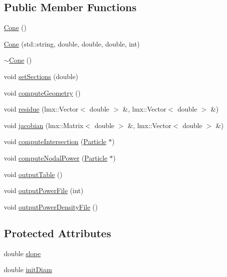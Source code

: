 \subsection*{Public Member Functions}
\begin{DoxyCompactItemize}
\item 
\hyperlink{classCone_aec709e915b3271a750d420b14b215bfb}{Cone} ()
\item 
\hyperlink{classCone_a28e740791e735a80d44ccb98ce9c5579}{Cone} (std\-::string, double, double, double, int)
\item 
\hyperlink{classCone_a36a6a946043f7b24a34e42cb88b5a4e8}{$\sim$\-Cone} ()
\item 
void \hyperlink{classCone_a52fd80b6c484449a8d24d1471e21873c}{set\-Sections} (double)
\item 
void \hyperlink{classCone_a98c5dc0bc0561ab92e76a8ab4da2f891}{compute\-Geometry} ()
\item 
void \hyperlink{classCone_a4c292bca1debd7c22f7e6cba03e50f46}{residue} (lmx\-::\-Vector$<$ double $>$ \&, lmx\-::\-Vector$<$ double $>$ \&)
\item 
void \hyperlink{classCone_a5443c4cbf223ee931f0626e92c353008}{jacobian} (lmx\-::\-Matrix$<$ double $>$ \&, lmx\-::\-Vector$<$ double $>$ \&)
\item 
void \hyperlink{classCone_a8bc1c798b9b7a34e5eba606212ca4a0f}{compute\-Intersection} (\hyperlink{classParticle}{Particle} $\ast$)
\item 
void \hyperlink{classCone_a26bfbb3dac2dc902e193413c0f61f9b1}{compute\-Nodal\-Power} (\hyperlink{classParticle}{Particle} $\ast$)
\item 
void \hyperlink{classCone_aa026083e1c8ecfd1f589eb1939b302c1}{output\-Table} ()
\item 
void \hyperlink{classCone_a9928e7033ce28a13e7d770a1620e096e}{output\-Power\-File} (int)
\item 
void \hyperlink{classCone_a435a6b46c506758157f2ed0d3213461f}{output\-Power\-Density\-File} ()
\end{DoxyCompactItemize}
\subsection*{Protected Attributes}
\begin{DoxyCompactItemize}
\item 
double \hyperlink{classCone_ab0de5b540524262d297001275d5e6d32}{slope}
\item 
double \hyperlink{classCone_a6a9d357f81bd97a8af3fb14b3d5b3d7a}{init\-Diam}
\end{DoxyCompactItemize}


